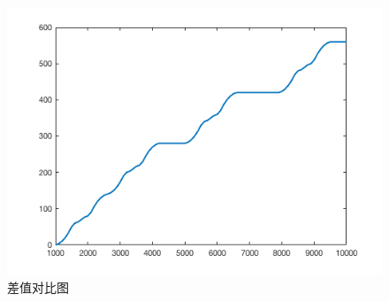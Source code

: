 \documentclass[10.5pt,twocolumn]{jbuaa}
\begin{document}
	\begin{figure}[!h]
	\centering
	\includegraphics[scale=0.4]{Figs/compare2.png}
	\caption{差值对比图}
	\label{fig:08}
	\end{figure}













	\renewcommand\refname{\hei\wuhao\centerline{参考文献（References）}\global\def\refname{参考文献}}
	\vskip 12pt

	\let\OLDthebibliography\thebibliography
	\renewcommand\thebibliography[1]{
		\OLDthebibliography{#1}
		\setlength{\parskip}{0pt}
		\setlength{\itemsep}{0pt plus 0.3ex}
	}

	{
		\renewcommand{\baselinestretch}{0.9}
		\liuhao
		
		
	}
  
\end{document}
